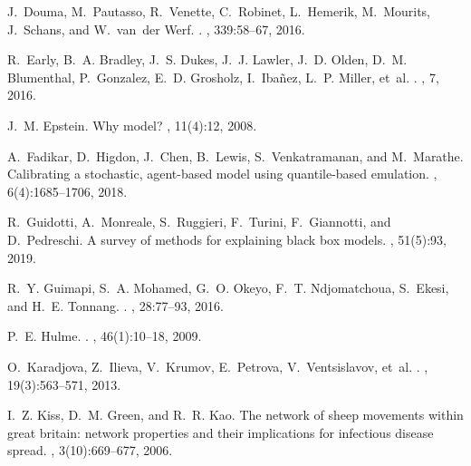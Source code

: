 \documentclass[11pt]{article}
\theoremstyle{definition}
\begin{document}
\begin{thebibliography}{10}
J.~Douma, M.~Pautasso, R.~Venette, C.~Robinet, L.~Hemerik, M.~Mourits,
  J.~Schans, and W.~van~der Werf.
.
, 339:58--67, 2016.

R.~Early, B.~A. Bradley, J.~S. Dukes, J.~J. Lawler, J.~D. Olden, D.~M.
  Blumenthal, P.~Gonzalez, E.~D. Grosholz, I.~Iba{\~n}ez, L.~P. Miller, et~al.
.
, 7, 2016.

J.~M. Epstein.
\newblock Why model?
,
  11(4):12, 2008.

A.~Fadikar, D.~Higdon, J.~Chen, B.~Lewis, S.~Venkatramanan, and M.~Marathe.
\newblock Calibrating a stochastic, agent-based model using quantile-based
  emulation.
,
  6(4):1685--1706, 2018.

R.~Guidotti, A.~Monreale, S.~Ruggieri, F.~Turini, F.~Giannotti, and
  D.~Pedreschi.
\newblock A survey of methods for explaining black box models.
, 51(5):93, 2019.

R.~Y. Guimapi, S.~A. Mohamed, G.~O. Okeyo, F.~T. Ndjomatchoua, S.~Ekesi, and
  H.~E. Tonnang.
.
, 28:77--93, 2016.

P.~E. Hulme.
.
, 46(1):10--18, 2009.

O.~Karadjova, Z.~Ilieva, V.~Krumov, E.~Petrova, V.~Ventsislavov, et~al.
.
, 19(3):563--571,
  2013.

I.~Z. Kiss, D.~M. Green, and R.~R. Kao.
\newblock The network of sheep movements within great britain: network
  properties and their implications for infectious disease spread.
, 3(10):669--677, 2006.


\end{thebibliography}
\end{document}
